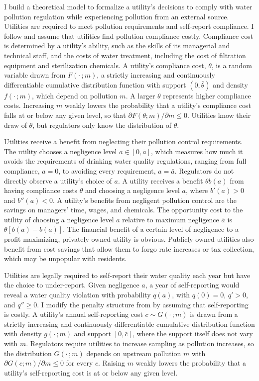 \documentclass[12pt]{article}
\begin{document}
	I build a theoretical model to formalize a utility's decisions to comply with water pollution regulation while experiencing pollution from an external source. Utilities are required to meet pollution requirements and self-report compliance. I follow \textcite{mookherjee1994marginal} and assume that utilities find pollution compliance costly. Compliance cost is determined by a utility's ability, such as the skills of its managerial and technical staff, and the costs of water treatment, including the cost of filtration equipment and sterilization chemicals. A utility's compliance cost, $\theta$, is a random variable drawn from $F(\cdot\,;m)$, a strictly increasing and continuously differentiable cumulative distribution function with support $(0, \bar{\theta})$ and density $f(\cdot\,;m)$, which depend on pollution $m$. A larger $\theta$ represents higher compliance costs. Increasing $m$ weakly lowers the probability that a utility's compliance cost falls at or below any given level, so that $\partial F(\theta;m)/\partial m \le 0$. Utilities know their draw of $\theta$, but regulators only know the distribution of $\theta$. 

    Utilities receive a benefit from neglecting their pollution control requirements. The utility chooses a negligence level $a \in [0, \bar{a}]$, which measures how much it avoids the requirements of drinking water quality regulations, ranging from full compliance, $a=0$, to avoiding every requirement, $a=\bar{a}$. Regulators do not directly observe a utility's choice of $a$. A utility receives a benefit $\theta b(a)$ from having compliance costs $\theta$ and choosing a negligence level $a$, where $b'(a)>0$ and $b''(a)<0$. A utility's benefits from negligent pollution control are the savings on managers' time, wages, and chemicals. The opportunity cost to the utility of choosing a negligence level $a$ relative to maximum negligence $\bar{a}$ is $\theta[b(\bar{a})-b(a)]$. The financial benefit of a certain level of negligence to a profit-maximizing, privately owned utility is obvious. Publicly owned utilities also benefit from cost savings that allow them to forgo rate increases or tax collection, which may be unpopular with residents.
	
	Utilities are legally required to self-report their water quality each year but have the choice to under-report. Given negligence $a$, a year of self-reporting would reveal a water quality violation with probability $q(a)$, with $q(0)=0$, $q'>0$, and $q'' \ge 0$. I modify the penalty structure from \textcite{kaplow1994optimal} by assuming that self-reporting is costly. A utility's annual self-reporting cost $c \sim G(\cdot\,;m)$ is drawn from a strictly increasing and continuously differentiable cumulative distribution function with density $g(\cdot\,;m)$ and support $[0,\bar{c}]$, where the support itself does not vary with $m$. Regulators require utilities to increase sampling as pollution increases, so the distribution $G(\cdot\,;m)$ depends on upstream pollution $m$ with $\partial G(c;m)/\partial m \le 0$ for every $c$. Raising $m$ weakly lowers the probability that a utility's self-reporting cost is at or below any given level. 
	
\end{document}
